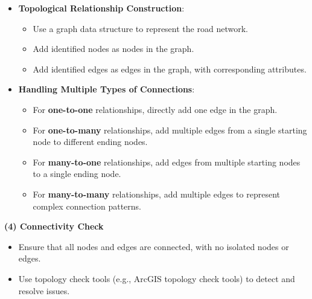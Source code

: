 \documentclass{mcmthesis}
\begin{document}
\begin{itemize}
    \item \textbf{Topological Relationship Construction}:
        \begin{itemize}
            \item Use a graph data structure to represent the road network.  

            \item Add identified nodes as nodes in the graph.  

            \item Add identified edges as edges in the graph, with corresponding attributes.  
        \end{itemize}
        

    \item \textbf{Handling Multiple Types of Connections}:
        \begin{itemize}
            \item For \textbf{one-to-one} relationships, directly add one edge in the graph. 

            \item For \textbf{one-to-many} relationships, add multiple edges from a single starting node to different ending nodes.  

            \item For \textbf{many-to-one} relationships, add edges from multiple starting nodes to a single ending node. 

            \item For \textbf{many-to-many} relationships, add multiple edges to represent complex connection patterns.
        \end{itemize}  

\end{itemize}

\vspace{-6mm}
\textbf{(4) Connectivity Check}
\vspace{-5mm}

\begin{itemize}
    \item Ensure that all nodes and edges are connected, with no isolated nodes or edges.

    \item Use topology check tools (e.g., ArcGIS topology check tools) to detect and resolve issues. 

\end{itemize}
\end{document}
